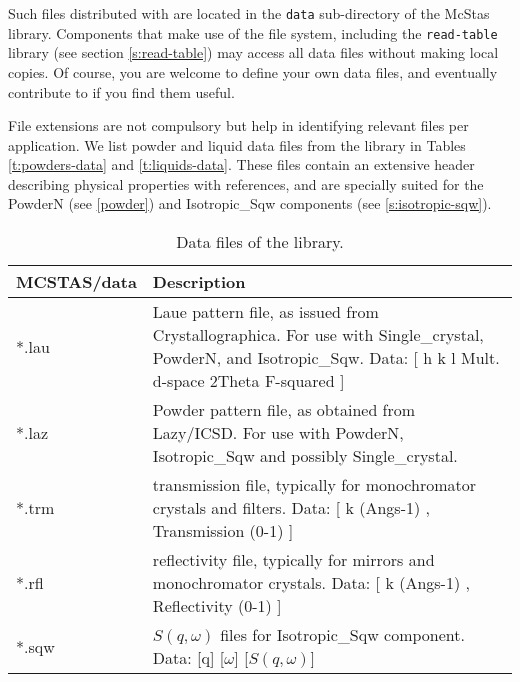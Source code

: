 Such files distributed with \MCS are located in the
\verb+data+ sub-directory of the McStas library.
Components that make use of the \MCS file system,
including the \verb+read-table+ library (see section \ref{s:read-table})
may access all \MCS data files without making local copies.
Of course, you are welcome to define your own data files,
and eventually contribute to \MCS if you find them useful.

File extensions are not compulsory but help in identifying relevant files per application. We list powder and liquid data files from the \MCS library in Tables \ref{t:powders-data} and \ref{t:liquids-data}. These files contain an extensive header describing physical properties with references, and are specially suited for the PowderN (see \ref{powder}) and Isotropic\_Sqw components (see \ref{s:isotropic-sqw}).

\begin{table}
  \begin{center}
    {\let\my=\\
    \begin{tabular}{|p{}|p{}|}
      \hline
       {\bf MCSTAS/data} & Description \\
       \hline
 *.lau & Laue pattern file, as issued from Crystallographica.
       For use with Single\_crystal, PowderN, and Isotropic\_Sqw.
       Data: [ h   k   l Mult. d-space 2Theta   F-squared ] \\
 *.laz & Powder pattern file, as obtained from Lazy/ICSD.
       For use with PowderN, Isotropic\_Sqw and possibly Single\_crystal.\\
 *.trm & transmission file, typically for monochromator crystals and filters.
       Data: [ k (Angs-1) , Transmission (0-1) ] \\
 *.rfl & reflectivity file, typically for mirrors and monochromator crystals.
       Data: [ k (Angs-1) , Reflectivity (0-1) ] \\
 *.sqw & $S(q,\omega)$ files for Isotropic\_Sqw component.
       Data: [q] [$\omega$] [$S(q,\omega)$]\\
      \hline
    \end{tabular}
    \caption{Data files of the \MCS library.}
    \label{t:comp-data}
    }
  \end{center}
\end{table}

